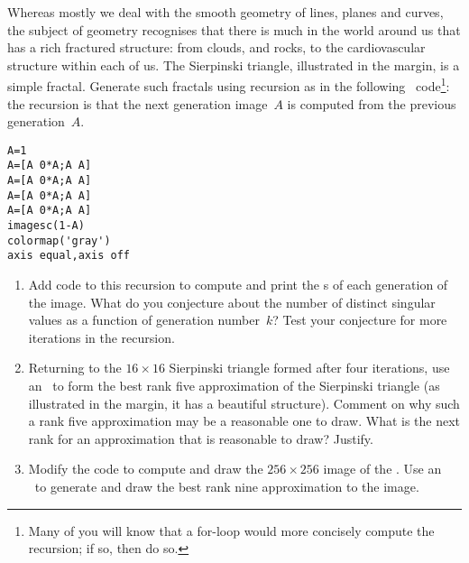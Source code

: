 \begin{exercise} \label{ex:siertri} 
Whereas mostly we deal with the smooth geometry of lines, planes and curves, 
the subject of  geometry recognises that there is much in the world around us that has a rich fractured structure: from clouds, and rocks, to the cardiovascular structure within each of us.
\marginpar{}
The Sierpinski triangle, illustrated in the margin, is a simple fractal.
Generate such fractals using recursion as in the following \script\ code\footnote{Many of you will know that a for-loop would more concisely compute the recursion; if so, then do so.}:
the recursion is that the next generation image~\(A\) is computed from the previous generation~\(A\).
\begin{verbatim}
A=1
A=[A 0*A;A A]
A=[A 0*A;A A]
A=[A 0*A;A A]
A=[A 0*A;A A]
imagesc(1-A)
colormap('gray')
axis equal,axis off
\end{verbatim}
%
\setbox\ajrqrbox\hbox{}%
\marginpar{\usebox{\ajrqrbox\\[2ex]}}%
\begin{enumerate}
\item Add code to this recursion to compute and print the s of each generation of the  image.
What do you conjecture about the number of distinct singular values as a function of generation number~\(k\)?
Test your conjecture for more iterations in the recursion.

\item Returning to the \(16\times16\) Sierpinski triangle formed after four iterations, use an \svd\ to form the best rank five approximation of the Sierpinski triangle (as illustrated in the margin, it has a beautiful structure).  
\marginpar{}%
Comment on why such a rank five approximation may be a reasonable one to draw.  
What is the next rank for an approximation that is reasonable to draw?  Justify.

\item Modify the code to compute and draw the \(256\times256\) image of the .
Use an \svd\ to generate and draw the best rank nine approximation to the image.
\end{enumerate}
\end{exercise}



